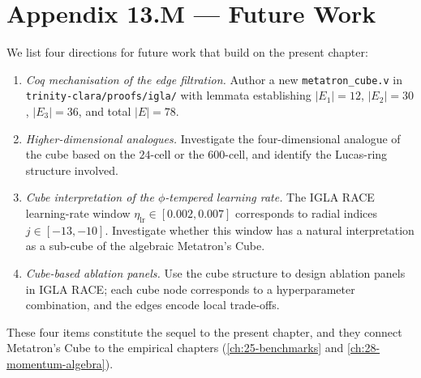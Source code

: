 \section*{Appendix 13.M --- Future Work}
\label{fa_13:sec:13-appM}

We list four directions for future work that build on the present
chapter:

\begin{enumerate}
\item \emph{Coq mechanisation of the edge filtration.} Author a
  new \verb|metatron_cube.v| in
  \verb|trinity-clara/proofs/igla/| with lemmata establishing
  $|E_{1}| = 12$, $|E_{2}| = 30$, $|E_{3}| = 36$, and total
  $|E| = 78$.
\item \emph{Higher-dimensional analogues.} Investigate the
  four-dimensional analogue of the cube based on the $24$-cell
  or the $600$-cell, and identify the Lucas-ring structure
  involved.
\item \emph{Cube interpretation of the $\phi$-tempered learning
  rate.} The IGLA RACE learning-rate window
  $\eta_{\mathrm{lr}} \in [0.002, 0.007]$ corresponds to radial
  indices $j \in [-13, -10]$. Investigate whether this window
  has a natural interpretation as a sub-cube of the algebraic
  Metatron's Cube.
\item \emph{Cube-based ablation panels.} Use the cube structure
  to design ablation panels in IGLA RACE; each cube node
  corresponds to a hyperparameter combination, and the edges
  encode local trade-offs.
\end{enumerate}

These four items constitute the sequel to the present chapter,
and they connect Metatron's Cube to the empirical chapters
(\ref{ch:25-benchmarks} and \ref{ch:28-momentum-algebra}).

